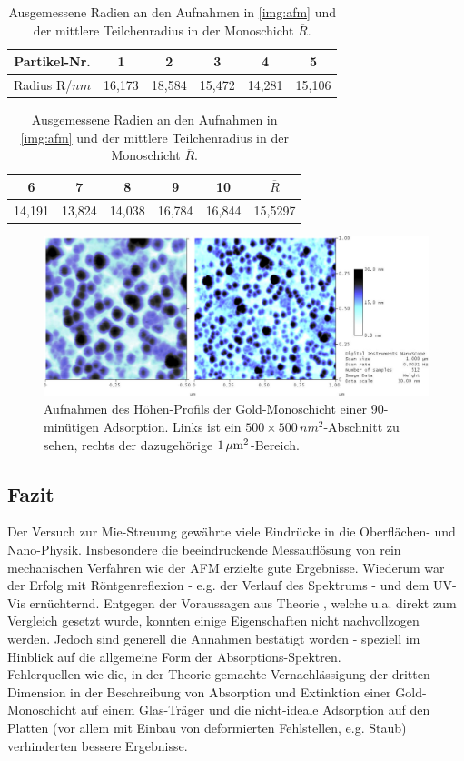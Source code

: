 \documentclass[numbers=noenddot,a4paper,notitlepage,twoside,BCOR15mm]{scrartcl}
\begin{document}
			\begin{table}[H]
				\centering
				\begin{tabular}{|c||c|c|c|c|c}
					Partikel-Nr. & 1 & 2 & 3 & 4 & 5  \\ 
					\hline  Radius R/$\unit{nm}$ & 16,173 & 18,584 & 15,472 & 14,281 & 15,106 
				\end{tabular}
				\begin{tabular}{c|c|c|c|c|c}
					6 & 7 & 8 & 9 & 10 & $\overline{R}$ \\
					\hline 14,191 & 13,824 & 14,038 & 16,784 & 16,844 & 15,5297
				\end{tabular}
				\caption{Ausgemessene Radien an den Aufnahmen in \autoref{img:afm} und der mittlere Teilchenradius in der Monoschicht $\overline{R}$.}
				\label{tab:radien}
			\end{table}

			\begin{figure}[H]
				\centering
				\includegraphics[width=\textwidth]{au90minbeide.jpg}
				\caption{Aufnahmen des Höhen-Profils der Gold-Monoschicht einer 90-minütigen Adsorption. Links ist ein $500\times500\,\unit{nm^2}$-Abschnitt zu sehen, rechts der dazugehörige $\unit[1]{\mu m^2}$-Bereich.}
				\label{img:afm}
			\end{figure}

		\subsection{Fazit}

			Der Versuch zur Mie-Streuung gewährte viele Eindrücke in die Oberflächen- und Nano-Physik. Insbesondere die beeindruckende Messauflösung von rein mechanischen Verfahren wie der AFM erzielte gute Ergebnisse. Wiederum war der Erfolg mit Röntgenreflexion - e.g. der Verlauf des Spektrums - und dem UV-Vis ernüchternd. Entgegen der Voraussagen aus Theorie , welche u.a. direkt zum Vergleich gesetzt wurde, konnten einige Eigenschaften nicht nachvollzogen werden. Jedoch sind generell die Annahmen bestätigt worden - speziell im Hinblick auf die allgemeine Form der Absorptions-Spektren.\\
			Fehlerquellen wie die, in der Theorie gemachte Vernachlässigung der dritten Dimension in der Beschreibung von Absorption und Extinktion einer Gold-Monoschicht auf einem Glas-Träger und die nicht-ideale Adsorption auf den Platten (vor allem mit Einbau von deformierten Fehlstellen, e.g. Staub) verhinderten bessere Ergebnisse.
\end{document}
